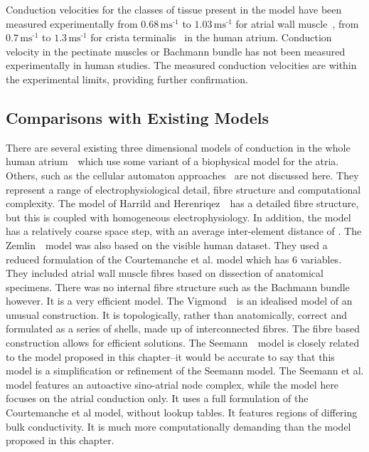 Conduction velocities for the classes of tissue present in the model have been
measured experimentally from $0.68\,\text{ms}^{\text{-1}}$ to
$1.03\,\text{ms}^{\text{-1}}$ for atrial wall
muscle~\cite{Hansson1998},
from $0.7\,\text{ms}^{\text{-1}}$ to 
$1.3\,\text{ms}^{\text{-1}}$ for crista
terminalis~\cite{Boineau1988} in the human atrium.
Conduction velocity in the pectinate muscles or Bachmann bundle has not been
measured experimentally in human studies.
The measured conduction velocities are within the experimental limits, providing
further confirmation.

\subsection{Comparisons with Existing Models}

There are several existing three dimensional models of conduction in the whole
human atrium~\cite{Harrild2000,Zemlin2000,Vigmond2001,Seemann2006}\ which use
some variant of a biophysical model for the atria.
Others, such as the cellular automaton approaches~\cite{Reumann2007} are not discussed here.
They represent a range of electrophysiological detail, fibre structure and
computational complexity.
The model of Harrild and Herenriqez~\cite{Harrild2000}\ has a detailed fibre
structure, but this is coupled with homogeneous electrophysiology.
In addition, the model has a relatively coarse space step, with an average
inter-element distance of .
The Zemlin~\cite{Zemlin2000}\ model was also based on the visible human dataset.
They used a reduced formulation of the Courtemanche et al. model which has 6
variables.
They included atrial wall muscle fibres based on dissection of anatomical
specimens.
There was no internal fibre structure such as the Bachmann bundle however.
It is a very efficient model.
The Vigmond~\cite{Vigmond2001}\ is an idealised model of an unusual construction.
It is topologically, rather than anatomically, correct and formulated as a
series of shells, made up of interconnected fibres.
The fibre based construction allows for efficient solutions.
The Seemann~\cite{Seemann2006}\ model is closely related to the model proposed in this
chapter--it would be accurate to say that this model is a simplification or
refinement of the Seemann model. 
The Seemann et al. model features an autoactive sino-atrial node complex, while
the model here focuses on the atrial conduction only.
It uses a full formulation of the Courtemanche et al model, without lookup
tables.
It features regions of differing bulk conductivity.
It is much more computationally demanding than the model proposed in this
chapter.

